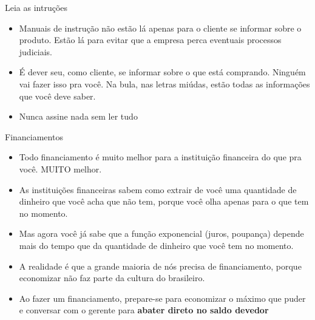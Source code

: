 \documentclass[]{beamer}
\begin{document}
\begin{frame}{Leia as intruções}
  \begin{itemize}
  \item Manuais de instrução não estão lá apenas para o
    cliente se informar sobre o produto. Estão lá para
    evitar que a empresa perca eventuais processos
    judiciais.
    \item É dever seu, como cliente, se informar sobre o que
      está comprando. Ninguém vai fazer isso pra você. Na
      bula, nas letras miúdas, estão todas as informações
      que você deve saber.
\item Nunca assine nada sem ler tudo
  \end{itemize}

\end{frame}
\begin{frame}{Financiamentos}
\begin{itemize}
\item Todo financiamento é muito melhor para a instituição
  financeira do que pra você. MUITO melhor.
\item As instituições financeiras sabem como extrair de você
  uma quantidade de dinheiro que você acha que não tem,
  porque você olha apenas para o que tem no momento.
  \pause
  \item Mas agora você já sabe que a função exponencial
    (juros, poupança) depende mais do tempo que da
    quantidade de dinheiro que você tem no momento.
    \pause
  \item A realidade é que a grande maioria de nós precisa de
    financiamento, porque economizar não faz parte da
    cultura do brasileiro.
    \pause
  \item Ao fazer um financiamento, prepare-se para
    economizar o máximo que puder e conversar com o gerente
    para \textbf{abater direto no saldo devedor}

\end{itemize}
\end{frame}
\end{document}
